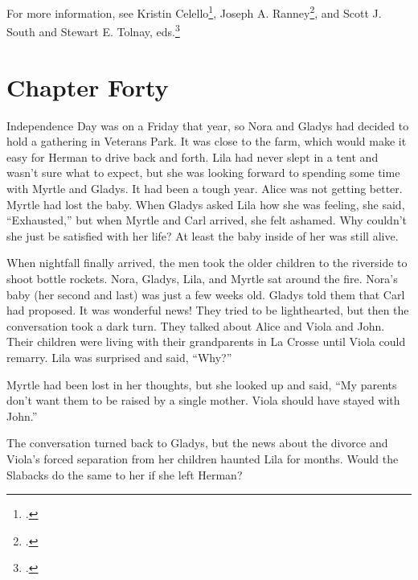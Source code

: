 \documentclass[
  letterpaper,
]{book}
\begin{document}
For more information, see Kristin Celello\footnote{.}, Joseph A. Ranney\footnote{.}, and
Scott J. South and Stewart E. Tolnay, eds.\footnote{.}


\chapter{Chapter Forty}\label{chapter-forty}

Independence Day was on a Friday that year, so Nora and Gladys had
decided to hold a gathering in Veterans Park. It was close to the farm,
which would make it easy for Herman to drive back and forth. Lila had
never slept in a tent and wasn't sure what to expect, but she was
looking forward to spending some time with Myrtle and Gladys. It had
been a tough year. Alice was not getting better. Myrtle had lost the
baby. When Gladys asked Lila how she was feeling, she said,
``Exhausted,'' but when Myrtle and Carl arrived, she felt ashamed. Why
couldn't she just be satisfied with her life? At least the baby inside
of her was still alive.

When nightfall finally arrived, the men took the older children to the
riverside to shoot bottle rockets. Nora, Gladys, Lila, and Myrtle sat
around the fire. Nora's baby (her second and last) was just a few weeks
old. Gladys told them that Carl had proposed. It was wonderful news!
They tried to be lighthearted, but then the conversation took a dark
turn. They talked about Alice and Viola and John. Their children were
living with their grandparents in La Crosse until Viola could remarry.
Lila was surprised and said, ``Why?''

Myrtle had been lost in her thoughts, but she looked up and said, ``My
parents don't want them to be raised by a single mother. Viola should
have stayed with John.''

The conversation turned back to Gladys, but the news about the divorce
and Viola's forced separation from her children haunted Lila for months.
Would the Slabacks do the same to her if she left Herman?
\end{document}
